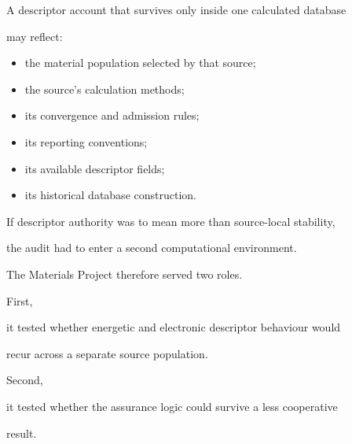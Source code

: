 \documentclass[11pt,a4paper,oneside]{report}
\begin{document}
A descriptor account that survives only inside one calculated database

may reflect:



\begin{itemize}



\item

the material population selected by that source;



\item

the source's calculation methods;



\item

its convergence and admission rules;



\item

its reporting conventions;



\item

its available descriptor fields;



\item

its historical database construction.



\end{itemize}



If descriptor authority was to mean more than source-local stability,

the audit had to enter a second computational environment.



The Materials Project therefore served two roles.



First,

it tested whether energetic and electronic descriptor behaviour would

recur across a separate source population.



Second,

it tested whether the assurance logic could survive a less cooperative

result.
\end{document}
